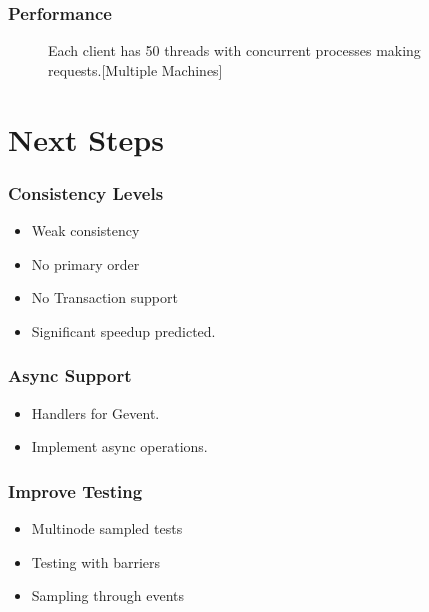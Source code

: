 \documentclass[10pt, compress]{beamer}
\begin{document}
\begin{frame}
    \frametitle{Performance}
    \begin{figure}
    \caption {Each client has 50 threads with concurrent processes making requests.[Multiple Machines]}
  \end{figure}
\end{frame}


\section{Next Steps}
\begin{frame}[fragile]
    \frametitle{Consistency Levels}
    \begin{itemize}
        \item Weak consistency
        \item No primary order
        \item No Transaction support
        \item Significant speedup predicted.
    \end{itemize}
\end{frame}

\begin{frame}
    \frametitle{Async Support}
    \begin{itemize}
        \item Handlers for Gevent.
        \item Implement async operations.
    \end{itemize}

\end{frame}

\begin{frame}
    \frametitle{Improve Testing}
    \begin{itemize}
        \item Multinode sampled tests
        \item Testing with barriers
        \item Sampling through events
    \end{itemize}
\end{frame}
\end{document}
